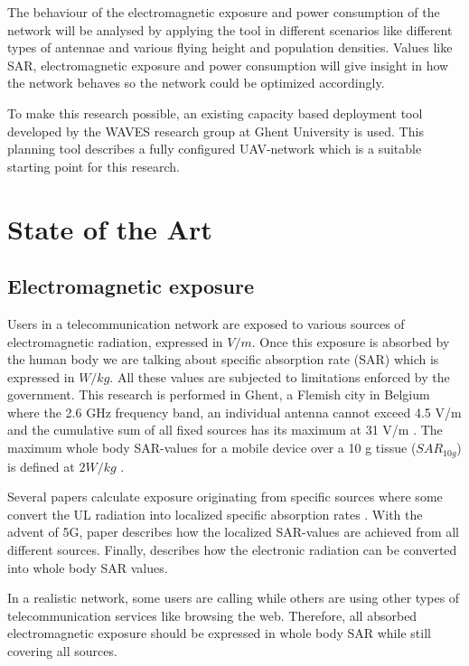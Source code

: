 \documentclass[twocolumn]{phdsymp} %
\begin{document}
The behaviour of the electromagnetic exposure and power consumption of the network will be analysed
 by applying the tool in different scenarios like different types of antennae and various flying height and population 
densities.
Values like \gls{SAR}, electromagnetic exposure and power consumption will 
 give insight in how the network behaves so the network could be optimized accordingly.

To make this research possible, 
an existing capacity based deployment tool developed by the WAVES research group at Ghent University is used.
This planning tool describes a fully configured \gls{UAV}-network which is a suitable starting point for this research.


\section{State of the Art}
\subsection{Electromagnetic exposure}

Users in a telecommunication network are exposed to various sources of electromagnetic radiation, expressed in $V/m$. Once this exposure is absorbed by the human 
body we are talking about specific absorption rate (SAR) which is expressed in $W/kg$. All these values are 
subjected to limitations enforced by the government. This research is performed in Ghent, 
a Flemish city in Belgium where the 2.6 GHz frequency band, an individual antenna cannot exceed 4.5 V/m and the cumulative sum of all 
fixed sources has its maximum at 31 V/m \cite{J23,S13_normenBelgie}. The maximum whole body SAR-values for a mobile device 
over a 10 g tissue ($SAR_{10g}$) is defined at $2 W/kg$ \cite{J30}. 

Several papers calculate exposure originating from specific sources  \cite{J6_originalExposureFormula,J1,J10_RDP,J10.1} 
where some convert the \gls{UL} radiation into localized specific absorption rates \cite{J10_RDP,J10.1}. 
With the advent of 5G, paper \cite{J17_kuehn2019modelling} describes 
how the localized \gls{SAR}-values are achieved from all different sources.
Finally, \cite{J22_plets2015joint} describes how the electronic radiation can be converted into whole body SAR values.

In a realistic network, some users are calling while others are using other types of telecommunication services like browsing the web.
Therefore, all absorbed electromagnetic exposure should be expressed in whole body SAR while still covering all sources.
\end{document}
